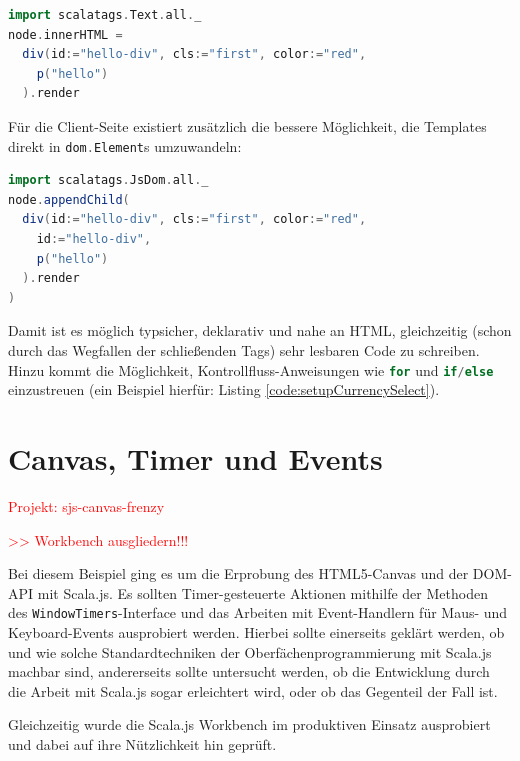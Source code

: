 \documentclass[a4paper, 12pt, hidelinks, listof=totoc, listoftables=totoc, bibliography=totoc]{scrreprt}
\newcommand{\code}[1]{\lstinline[language=Scala, style=inline]|#1|}
\newcommand{\scala}[1]{\lstinline[language=Scala, style=inline]|#1|}
\newcommand{\TODO}[1]{\textcolor{red}{#1}\newline}
\begin{document}
\begin{lstlisting}[language=Scala, caption={HTML-Generierung mit ScalaTags und Strings.}]
import scalatags.Text.all._
node.innerHTML =
  div(id:="hello-div", cls:="first", color:="red",
    p("hello")
  ).render
\end{lstlisting}

Für die Client-Seite existiert zusätzlich die bessere Möglichkeit, die Templates direkt in \scala{dom.Element}s umzuwandeln:

\begin{lstlisting}[language=Scala, caption={HTML-Generierung mit ScalaTags und Nodes.}]
import scalatags.JsDom.all._
node.appendChild(
  div(id:="hello-div", cls:="first", color:="red",
    id:="hello-div",
    p("hello")
  ).render
)
\end{lstlisting}

Damit ist es möglich typsicher, deklarativ und nahe an \ac{HTML}, gleichzeitig (schon durch das Wegfallen der schließenden Tags) sehr lesbaren Code zu schreiben. Hinzu kommt die Möglichkeit, Kontrollfluss-Anweisungen wie \scala{for} und \scala{if/else} einzustreuen (ein Beispiel hierfür: Listing \ref{code:setupCurrencySelect}).



\section{Canvas, Timer und Events}

\TODO{Projekt: sjs-canvas-frenzy}

\TODO{>> Workbench ausgliedern!!!}


Bei diesem Beispiel ging es um die Erprobung des HTML5-Canvas und der \ac{DOM}-\ac{API} mit Scala.js. Es sollten Timer-gesteuerte Aktionen mithilfe der Methoden des \code{WindowTimers}-Interface und das Arbeiten mit Event-Handlern für Maus- und Keyboard-Events ausprobiert werden. Hierbei sollte einerseits geklärt werden, ob und wie solche Standardtechniken der Oberfächenprogrammierung mit Scala.js machbar sind, andererseits sollte untersucht werden, ob die Entwicklung durch die Arbeit mit Scala.js sogar erleichtert wird, oder ob das Gegenteil der Fall ist.

Gleichzeitig wurde die Scala.js Workbench im produktiven Einsatz ausprobiert und dabei auf ihre Nützlichkeit hin geprüft.
\end{document}
